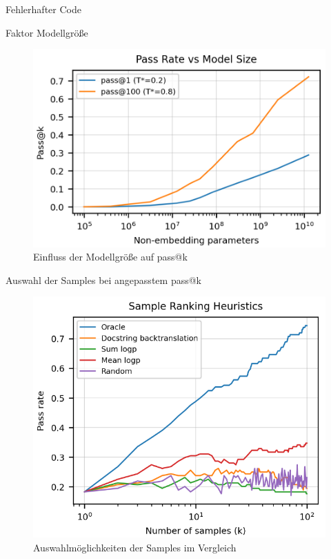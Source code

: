 \documentclass{beamer}              %
\begin{document}
\begin{frame}{Fehlerhafter Code}
\begin{frame}{Faktor Modellgröße}
    \begin{figure}
        \centering
        \includegraphics[width=0.7\paperwidth]{images/passkvssize.png}
        \caption{Einfluss der Modellgröße auf pass@k\cite{chen2021evaluating}}
    \end{figure}
\end{frame}

\begin{frame}{Auswahl der Samples bei angepasstem pass@k}
    \begin{figure}
        \centering
        \includegraphics[width=0.55\paperwidth]{images/heuristcs.png}
        \caption{Auswahlmöglichkeiten der Samples im Vergleich\cite{chen2021evaluating}}
    \end{figure}
\end{frame}


\end{frame}
\end{document}
